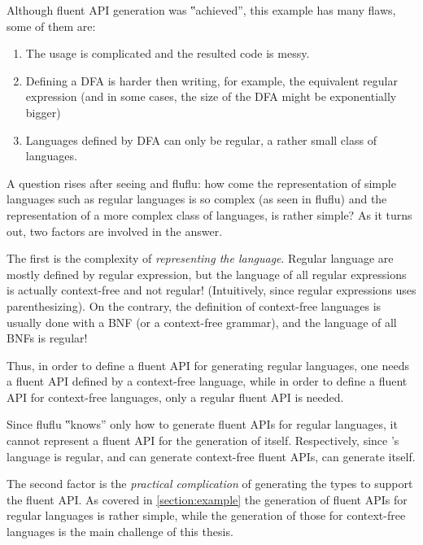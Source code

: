 Although fluent API generation was ‟achieved”, this example has many flaws, some of them are:

\begin{enumerate}
  \item The usage is complicated and the resulted code is messy.
  \item Defining a DFA is harder then writing, for example, the equivalent regular
        expression (and in some cases, the size of the DFA might be exponentially bigger)
  \item Languages defined by DFA can only be regular, a rather small
        class of languages.
\end{enumerate}

A question rises after seeing \Fajita and fluflu: how come the representation
of simple languages such as regular languages is so complex (as seen in fluflu)
and the representation of a more complex class of languages, is rather simple?
As it turns out, two factors are involved in the answer.

The first is the complexity of \emph{representing the language}.
Regular language are mostly defined by regular expression, but the language of
all regular expressions is actually context-free and not regular!
(Intuitively, since regular expressions uses parenthesizing). On the contrary,
the definition of context-free languages is usually done with a BNF (or a
context-free grammar), and the language of all BNFs is regular!

Thus, in order to define a fluent API for generating regular languages, one needs a
fluent API defined by a context-free language, while in order to define a fluent API for
context-free languages, only a regular fluent API is needed.

Since fluflu ‟knows” only how to generate fluent APIs for regular languages,
it cannot represent a fluent API for the generation of itself.
Respectively, since \Fajita's language is regular, and can generate context-free
  fluent APIs, \Fajita can generate itself.

The second factor is the \emph{practical complication} of generating the \Java types to
support the fluent API. As covered in \cref{section:example} the generation of
fluent APIs for regular languages is rather simple, while the generation of
those for context-free languages is the main challenge of this thesis.
